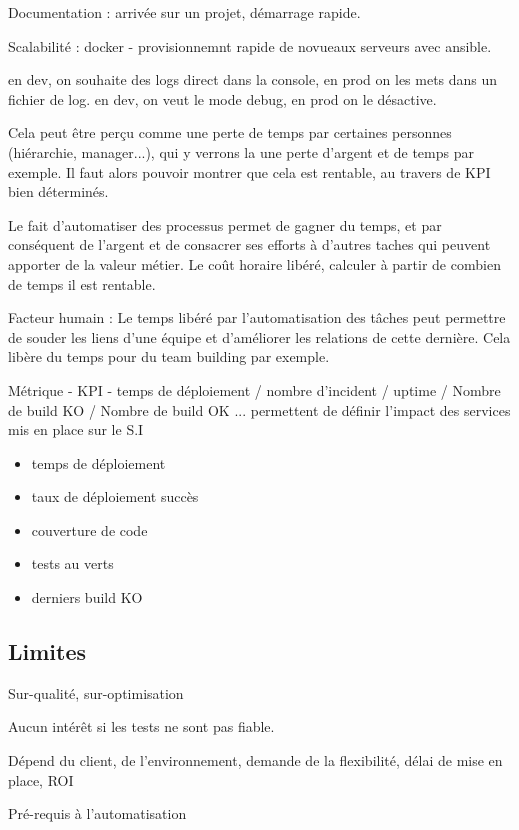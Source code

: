 Documentation : arrivée sur un projet, démarrage rapide.

Scalabilité : docker - provisionnemnt rapide de novueaux serveurs avec ansible.

en dev, on souhaite des logs direct dans la console, en prod on les mets dans un fichier de log.
en dev, on veut le mode debug, en prod on le désactive.

Cela peut être perçu comme une perte de temps par certaines personnes (hiérarchie, manager...), qui y verrons la une perte d'argent et de temps par exemple. Il faut alors pouvoir montrer que cela est rentable, au travers de \gls{KPI} bien déterminés.

Le fait d'automatiser des processus permet de gagner du temps, et par conséquent de l'argent et de consacrer ses efforts à d'autres taches qui peuvent apporter de la valeur métier. Le coût horaire libéré, calculer à partir de combien de temps il est rentable.

Facteur humain : Le temps libéré par l'automatisation des tâches peut permettre de souder les liens d'une équipe et d'améliorer les relations de cette dernière. Cela libère du temps pour du team building par exemple.

Métrique - KPI - temps de déploiement / nombre d'incident / uptime / Nombre de build KO / Nombre de build OK ... permettent de définir l'impact des services mis en place sur le S.I

\begin{itemize}
	\item temps de déploiement
	\item taux de déploiement succès
	\item couverture de code
	\item tests au verts
	\item derniers build KO
\end{itemize}

\subsection*{Limites}


Sur-qualité, sur-optimisation

Aucun intérêt si les tests ne sont pas fiable.

Dépend du client, de l'environnement, demande de la flexibilité, délai de mise en place, ROI

Pré-requis à l'automatisation

